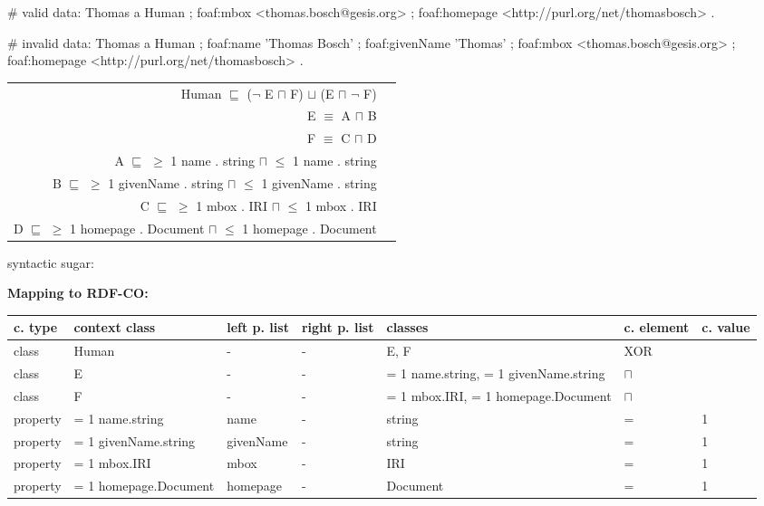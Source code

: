 \documentclass{llncs}
\newenvironment{gcotable}{
  \scriptsize
  \sffamily
  \vspace{0cm}
	\begin{center}
	\textbf{\vspace{0.4cm}Mapping to RDF-CO:} \\
  \begin{tabular}{l|l|l|l|l|l|l}
	\hline
  \textbf{c. type} & \textbf{context class} & \textbf{left p. list} & \textbf{right p. list} & \textbf{classes} & \textbf{c. element} & \textbf{c. value} \\
  \hline

}{
  \hline
  \end{tabular}
	\end{center}
}
\newenvironment{DL}{
  \vspace{0cm}
	\begin{center}
  \begin{tabular}{r l}

}{
  \end{tabular}
	\end{center}
}
\begin{document}
\begin{ex}
# valid data:
Thomas
    a Human ;
    foaf:mbox <thomas.bosch@gesis.org> ;
    foaf:homepage <http://purl.org/net/thomasbosch> .
\end{ex}

\begin{ex}
# invalid data:
Thomas
    a Human ;
    foaf:name 'Thomas Bosch' ;
    foaf:givenName 'Thomas' ;
    foaf:mbox <thomas.bosch@gesis.org> ;
    foaf:homepage <http://purl.org/net/thomasbosch> .
\end{ex}

\begin{DL}
Human $\sqsubseteq$ ($\neg$ E $\sqcap$ F) $\sqcup$ (E $\sqcap$ $\neg$ F) \\ 
E $\equiv$ A $\sqcap$ B \\
F $\equiv$ C $\sqcap$ D \\
A $\sqsubseteq$ $\geq$ 1 name . string $\sqcap$ $\leq$ 1 name . string \\
B $\sqsubseteq$ $\geq$ 1 givenName . string $\sqcap$ $\leq$ 1 givenName . string \\
C $\sqsubseteq$ $\geq$ 1 mbox . IRI $\sqcap$ $\leq$ 1 mbox . IRI \\
D $\sqsubseteq$ $\geq$ 1 homepage . Document $\sqcap$ $\leq$ 1 homepage . Document \\
\end{DL}

syntactic sugar:
\begin{gcotable}
class & Human & - & - & E, F & XOR \\
class & E & - & - & = 1 name.string, = 1 givenName.string & $\sqcap$ \\
class & F & - & - & = 1 mbox.IRI, = 1 homepage.Document & $\sqcap$ \\
property & = 1 name.string & name & - & string & = & 1 \\
property & = 1 givenName.string & givenName & - & string & = & 1 \\
property & = 1 mbox.IRI & mbox & - & IRI & = & 1 \\
property & = 1 homepage.Document & homepage & - & Document & = & 1 \\
\end{gcotable}
\end{document}
